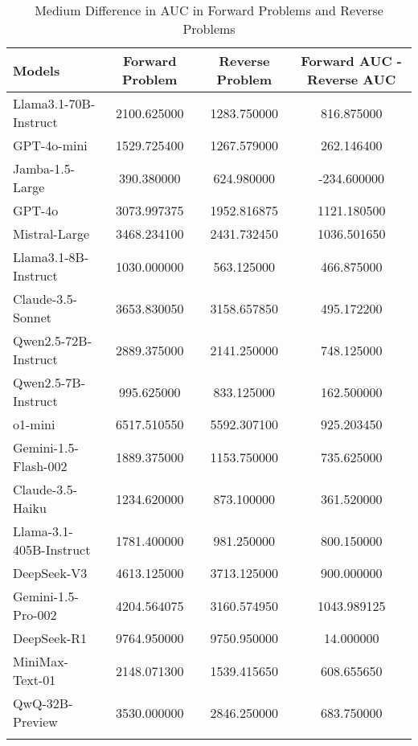 \begin{longtable}{|l|c|c|c|} 
\hline
\textbf{Models} & \textbf{Forward Problem} & \textbf{Reverse Problem} & \textbf{Forward AUC - Reverse AUC} \\ \hline
Llama3.1-70B-Instruct & 2100.625000 & 1283.750000 & 816.875000 \\ \hline
GPT-4o-mini & 1529.725400 & 1267.579000 & 262.146400 \\ \hline
\rowcolor{yellow!20} 
Jamba-1.5-Large & 390.380000 & 624.980000 & -234.600000 \\ \hline
GPT-4o & 3073.997375 & 1952.816875 & 1121.180500 \\ \hline
Mistral-Large & 3468.234100 & 2431.732450 & 1036.501650 \\ \hline
Llama3.1-8B-Instruct & 1030.000000 & 563.125000 & 466.875000 \\ \hline
Claude-3.5-Sonnet & 3653.830050 & 3158.657850 & 495.172200 \\ \hline
Qwen2.5-72B-Instruct & 2889.375000 & 2141.250000 & 748.125000 \\ \hline
Qwen2.5-7B-Instruct & 995.625000 & 833.125000 & 162.500000 \\ \hline
o1-mini & 6517.510550 & 5592.307100 & 925.203450 \\ \hline
Gemini-1.5-Flash-002 & 1889.375000 & 1153.750000 & 735.625000 \\ \hline
Claude-3.5-Haiku & 1234.620000 & 873.100000 & 361.520000 \\ \hline
Llama-3.1-405B-Instruct & 1781.400000 & 981.250000 & 800.150000 \\ \hline
DeepSeek-V3 & 4613.125000 & 3713.125000 & 900.000000 \\ \hline
Gemini-1.5-Pro-002 & 4204.564075 & 3160.574950 & 1043.989125 \\ \hline
DeepSeek-R1 & 9764.950000 & 9750.950000 & 14.000000 \\ \hline
MiniMax-Text-01 & 2148.071300 & 1539.415650 & 608.655650 \\ \hline
QwQ-32B-Preview & 3530.000000 & 2846.250000 & 683.750000 \\ \hline 
\caption{Medium Difference in AUC in Forward Problems and Reverse Problems} 
\end{longtable} 

